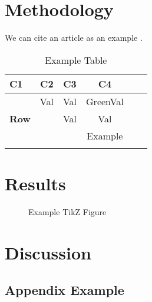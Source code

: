 \documentclass[12pt, a4paper]{report}
\begin{document}
\chapter{Methodology}
\label{Chap2}
We can cite an article as an example \cite{DeepMindRef}. \lipsum[4-8]
\begin{table}[H]
   \caption{Example Table}
   \small
   \centering
   \begin{tabular}{lccccr}
   \toprule[\heavyrulewidth]\toprule[\heavyrulewidth]
   \textbf{C1} & \textbf{C2} & \textbf{C3} & \textbf{C4}\\ 
   \midrule
\multirow{3}{*}{\textbf{Row}}& Val & Val & \textcolor{igreen}{GreenVal}\\
   & & Val  & \textcolor{igreen}{Val}\\
& &  & \textcolor{igreen}{Example}\\ \hdashline
   \bottomrule[\heavyrulewidth] 
   \end{tabular}
\end{table}


\chapter{Results}
\label{Chap3}
\lipsum[1-4]
\begin{figure}
    \centering
{}
\caption{Example TikZ Figure}
\end{figure}
\chapter{Discussion}
\label{Chap4}
\lipsum[9-10]

\renewcommand{\bibname}{Bibliography}



\begin{appendices}
\chapter{Appendix Example}
\end{appendices}
\end{document}
